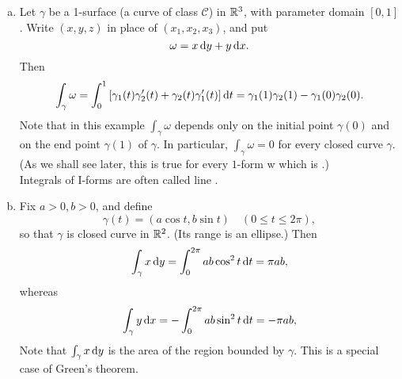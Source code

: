 \begin{newexample}
    \label{newexample:10.12}
    \begin{enumerate}[(a)]
        \item Let $\gamma$ be a 1-surface (a curve of class $\mathscr{C}$) in ${\protect\mathbb R}^3$, with parameter domain $[0, 1 ]$.
              Write $(x, y, z)$ in place of $(x_1, x_2 , x_3)$, and put
              \begin{equation*}
                  \omega = x \d y + y \d x .
              \end{equation*}
              Then
              \begin{equation*}
                  \int_{\gamma} \omega = \int_{0}^{1} \left[ \gamma_1(t) \gamma'_2(t)+\gamma_2(t) \gamma'_1(t) \right] \d t =
                  \gamma_1(1)
                  \gamma_2(1) -
                  \gamma_1(0)
                  \gamma_2(0) .
              \end{equation*}
              Note that in this example $\int_{\gamma} \omega$ depends only on the initial point $\gamma(0)$ and on the end point $\gamma(1)$ of $\gamma$.
              In particular, $\int_{\gamma} \omega = 0$ for every closed curve $\gamma$.
              (As we shall see later, this is true for every $1$-form w which is .) \\
              Integrals of I-forms are often called line .
        \item Fix $a>0,b>0$, and define
              \begin{equation*}
                  \gamma(t) = (a \cos t, b \sin t)
                  \quad
                  (0 \leq t \leq 2\pi),
              \end{equation*}
              so that $\gamma$ is closed curve in ${\protect\mathbb R}^2$.
              (Its range is an ellipse.)
              Then
              \begin{equation*}
                  \int_{\gamma} x \d y =
                  \int_{0}^{2\pi} ab \cos ^2 t \d t =
                  \pi ab,
              \end{equation*}
              whereas
              \begin{equation*}
                  \int_{\gamma} y \d x =
                  -\int_{0}^{2\pi} ab \sin ^2 t \d t =
                  -\pi ab,
              \end{equation*}
              Note that $\int_{\gamma} x \d y$ is the area of the region bounded by $\gamma$.
              This is a special case of Green's theorem.

\end{enumerate}
\end{newexample}
